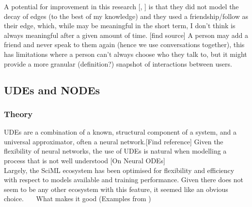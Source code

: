 \documentclass{article}
\begin{document}
        A potential for improvement in this research [\cite{garg2009evolution}, \cite{zhao2012multi}] is that they did not model the decay of edges (to the best of my knowledge) and they used a friendship/follow as their edge, which, while may be meaningful in the short term, I don't think is always meaningful after a given amount of time. [find source] A person may add a friend and never speak to them again (hence we use conversations together), this has limitations where a person can't always choose who they talk to, but it might provide a more granular (definition?) snapshot of interactions between users.\\
    \subsection{UDEs and NODEs}
      \subsubsection{Theory}
         UDEs are a combination of a known, structural component of a system, and a universal approximator, often a neural network.[Find reference]
         Given the flexibility of neural networks, the use of UDEs is natural when modelling a process that is not well understood [On Neural ODEs]
         \\
         Largely, the SciML ecosystem has been optimised for flexibility and efficiency with respect to models available 
         and training performance. Given there does not seem to be any other ecosystem with this feature, it seemed like 
         an obvious choice. ~~~What makes it good (Examples from \cite{SciML_C_Rak})  \\
        
\end{document}
